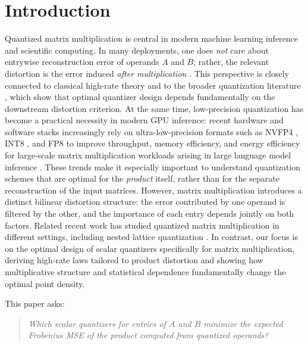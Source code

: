 \documentclass{article}
\begin{document}
\section{Introduction}
Quantized matrix multiplication is central in modern machine learning inference and scientific computing. In many deployments, one does \emph{not} care about entrywise reconstruction error of operands $A$ and $B$; rather, the relevant distortion is the error induced \emph{after multiplication} \cite{ordentlichpolyanskiy2025optimal}. This perspective is closely connected to classical high-rate theory \cite{bennett1948spectra} and to the broader quantization literature \cite{gersho2012vector}, which show that optimal quantizer design depends fundamentally on the downstream distortion criterion. At the same time, low-precision quantization has become a practical necessity in modern GPU inference: recent hardware and software stacks increasingly rely on ultra-low-precision formats such as NVFP4 \cite{nvidia2025nvfp4}, INT8 \cite{dettmers2022llmint88bitmatrixmultiplication}, and FP8 \cite{micikevicius2022fp8formatsdeeplearning} to improve throughput, memory efficiency, and energy efficiency for large-scale matrix multiplication workloads arising in large language model inference . These trends make it especially important to understand quantization schemes that are optimal for the \emph{product} itself, rather than for the separate reconstruction of the input matrices. However, matrix multiplication introduces a distinct bilinear distortion structure: the error contributed by one operand is filtered by the other, and the importance of each entry depends jointly on both factors. Related recent work has studied quantized matrix multiplication in different settings, including nested lattice quantization \cite{ordentlichpolyanskiy2025optimal}. In contrast, our focus is on the optimal design of scalar quantizers specifically for matrix multiplication, deriving high-rate laws tailored to product distortion and showing how multiplicative structure and statistical dependence fundamentally change the optimal point density.

This paper asks:
\begin{quote}
\emph{Which scalar quantizers for entries of $A$ and $B$ minimize the expected Frobenius MSE of the product computed from quantized operands?}
\end{quote}
\end{document}
